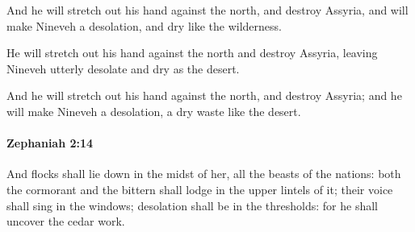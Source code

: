 			\begin{versebox}
					\item[BHS] 
					\item[LXX] 
					\item[ASV] And he will stretch out his hand against the north, and destroy Assyria, and will make Nineveh a desolation, and dry like the wilderness.
					\item[NIV] He will stretch out his hand against the north and destroy Assyria, leaving Nineveh utterly desolate and dry as the desert.
					\item[NRSV] And he will stretch out his hand against the north, and destroy Assyria; and he will make Nineveh a desolation, a dry waste like the desert.
			\end{versebox}

		\paragraph{Zephaniah 2:14} %
			\label{ZEPHANIAH-2-14}

			And flocks shall lie down in the midst of her, all the beasts of the nations: both the cormorant and the bittern shall lodge in the upper lintels of it; their voice shall sing in the windows; desolation shall be in the thresholds: for he shall uncover the cedar work.

